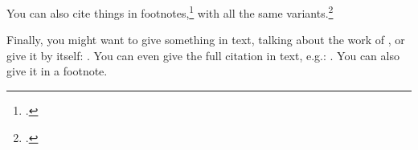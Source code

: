 \documentclass[12pt]{article}
\begin{document}
You can also cite things in footnotes,\footcite{Khan1972} with all the same variants.\footcites[Also see][33]{Bonaparte1923}[42]{Victoria2012}

Finally, you might want to give something in text, talking about the work of \textcite{Khan1972}, or give it by itself: \cite{Caesar1991}. You can even give the full citation in text, e.g.: . You can also give it in a footnote.

\nocite{*}

\printbibliography
\end{document}
